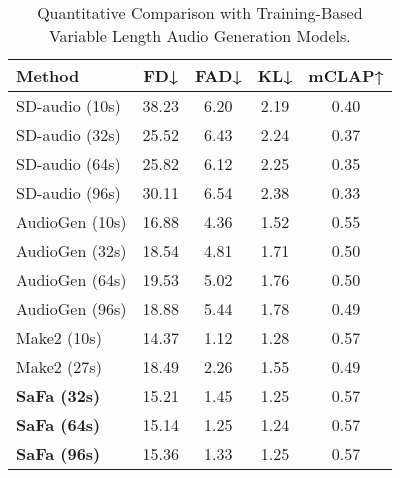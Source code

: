 \begin{table}[!t]
\centering
\setlength{\tabcolsep}{2.0mm}
\begin{tabular}{lcccc}
\toprule[1pt]
\textbf{Method}              & \textbf{FD↓}   & \textbf{FAD↓} & \textbf{KL↓}  & \textbf{mCLAP↑} \\ \hline
SD-audio (10s)             & 38.23 & 6.20  & 2.19 & 0.40   \\
SD-audio (32s)             & 25.52 & 6.43 & 2.24 & 0.37   \\
SD-audio (64s)             & 25.82 & 6.12 & 2.25 & 0.35   \\
SD-audio (96s)             & 30.11 & 6.54 & 2.38 & 0.33   \\ \hline
AudioGen (10s)      & 16.88 & 4.36 & 1.52 & 0.55   \\
AudioGen (32s)      & 18.54 & 4.81 & 1.71 & 0.50   \\
AudioGen (64s)      & 19.53 & 5.02 & 1.76 & 0.50   \\
AudioGen (96s)      & 18.88 & 5.44 & 1.78 & 0.49   \\ \hline
Make2 (10s)         & 14.37 & 1.12 & 1.28 & 0.57   \\
Make2 (27s)         & 18.49 & 2.26& 1.55  & 0.49   \\ \hline
\textbf{SaFa (32s)} & 15.21 & 1.45 & 1.25 & 0.57   \\
\textbf{SaFa (64s)} & 15.14 & 1.25 & 1.24 & 0.57   \\
\textbf{SaFa (96s)} & 15.36 & 1.33 & 1.25 & 0.57   \\
\bottomrule[1pt]
\end{tabular}
\vspace{-5pt}
\caption{Quantitative Comparison with Training-Based Variable Length Audio Generation Models.}
\vspace{-15pt}
\label{tab:ap1}
\end{table}






\vspace{-10pt}
